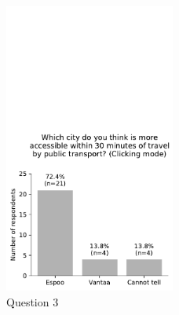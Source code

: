 \begin{figure}[H]
	\centering
	\includegraphics[width=0.5\textwidth]{images/questionnaire/2.pdf}
	\caption{Question 3}
	\label{fig:Question 3}
\end{figure}

